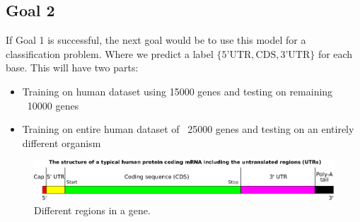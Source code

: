 \documentclass[11pt]{article}
\begin{document}
\subsection*{Goal 2}
If Goal 1 is successful, the next goal would be to use this model for a classification problem. Where we predict a label  $\{ \text{5'UTR}, \text{CDS}, \text{3'UTR} \}$ for each base. This will have two parts:
\begin{itemize}
\item Training on human dataset using 15000 genes and testing on remaining ~10000 genes
\item Training on entire human dataset of ~25000 genes and testing on an entirely different organism
\end{itemize}


\begin{figure}[h]
\includegraphics[width=\textwidth]{cds}
\caption{Different regions in a gene.}
\end{figure}
\end{document}
